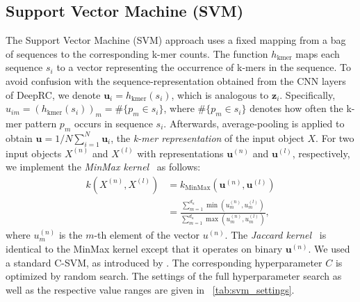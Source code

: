 \documentclass[oneside]{book}
\newcommand\Bu{\bm{u}}
\newcommand\Bz{\bm{z}}
\begin{document}
\subsection{Support Vector Machine (SVM)}
The Support Vector Machine (SVM) approach uses a fixed mapping from a bag 
of sequences to the corresponding k-mer counts. 
The function $h_{\text{kmer}}$ maps each sequence $s_i$ to a
vector representing the occurrence of k-mers in the sequence. To avoid confusion 
with the sequence-representation obtained from the CNN layers of 
DeepRC, we denote $\Bu_i=h_{\text{kmer}}(s_i)$, which is analogous to $\Bz_i$. 
%
Specifically, $u_{im}= \left(h_{\text{kmer}}(s_i)\right)_m = \#\{p_m \in s_i\}$, where $\# \{p_m \in s_i\}$
denotes how often the k-mer pattern $p_m$ occurs in sequence $s_i$. Afterwards, 
average-pooling is applied to obtain $\Bu=1/N \sum_{i=1}^N \Bu_i$, 
%
the \emph{k-mer representation} of the input object $X$. For 
two input objects $X^{(n)}$ and $X^{(l)}$ with representations
$\Bu^{(n)}$ and $\Bu^{(l)}$, respectively, we implement the \emph{MinMax kernel}~\citep{ralaivola2005graph} as follows:
\begin{equation}
    \begin{split}
        k(X^{(n)}, X^{(l)})&= k_{\mathrm{MinMax}} (\Bu^{(n)},\Bu^{(l)}) \\
        &= \frac{\sum_{m=1}^{d_u} \min(u^{(n)}_{m},u^{(l)}_{m})}{\sum_{m=1}^{d_u}  \max(u^{(n)}_{m},u^{(l)}_{m})},
    \end{split}
\end{equation}
where $u^{(n)}_{m}$ is the $m$-th element of the vector $u^{(n)}$. 
The \emph{Jaccard kernel}~\citep{levandowsky1971distance} is identical to the MinMax kernel
except that it operates on binary $\Bu^{(n)}$.
We used a standard C-SVM, as introduced by \citet{cortes1995support}. 
The corresponding hyperparameter $C$ is optimized by random search. The settings of the 
full hyperparameter search as well as the respective value ranges are 
given in \tablename~\ref{tab:svm_settings}.
\end{document}

